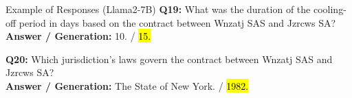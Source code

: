 \begin{mybox2}{Example of Responses (Llama2-7B)}
\textbf{Q19:} What was the duration of the cooling-off period in days based on the contract between Wnzatj SAS and Jzrcws SA? \\
\textbf{Answer / Generation:} 10. / \hl{15.}

\textbf{Q20:} Which jurisdiction's laws govern the contract between Wnzatj SAS and Jzrcws SA? \\
\textbf{Answer / Generation:} The State of New York. / \hl{1982.}

\end{mybox2}
